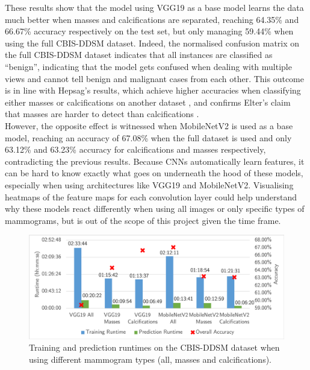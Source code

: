 

These results show that the model using VGG19 as a base model learns the data much better when masses and calcifications are separated, reaching 64.35\% and 66.67\% accuracy respectively on the test set, but only managing 59.44\% when using the full CBIS-DDSM dataset. Indeed, the normalised confusion matrix on the full CBIS-DDSM dataset indicates that all instances are classified as ``benign'', indicating that the model gets confused when dealing with multiple views and cannot tell benign and malignant cases from each other. This outcome is in line with Hepsag's results, which achieve higher accuracies when classifying either masses or calcifications on another dataset \citep{Hepsag2017}, and confirms Elter's claim that masses are harder to detect than calcifications \citep{Elter2009}.\\

However, the opposite effect is witnessed when MobileNetV2 is used as a base model, reaching an accuracy of 67.08\% when the full dataset is used and only 63.12\% and 63.23\% accuracy for calcifications and masses respectively, contradicting the previous results. Because CNNs automatically learn features, it can be hard to know  exactly what goes on underneath the hood of these models, especially when using architectures like VGG19 and MobileNetV2. Visualising heatmaps of the feature maps for each convolution layer could help understand why these models react differently when using all images or only specific types of mammograms, but is out of the scope of this project given the time frame.

\begin{figure}[H]
\centerline{\includegraphics[width=\textwidth]{figures/evaluation/mammogram_type_experiment/runtimes.png}}
\caption{\label{fig:evaluation-mammogram_type_experiment-runtimes.png}Training and prediction runtimes on the CBIS-DDSM dataset when using different mammogram types (all, masses and calcifications).}
\end{figure}

